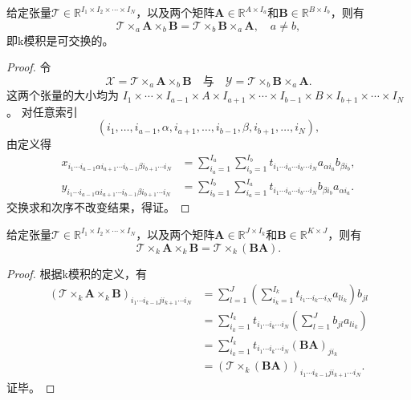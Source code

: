 \begin{property}
    给定张量\( \mathcal{T} \in \mathbb{R}^{I_1 \times I_2 \times \cdots \times I_N} \)，以及两个矩阵\( \mathbf{A} \in \mathbb{R}^{A \times I_a} \)和\( \mathbf{B} \in \mathbb{R}^{B \times I_b} \)，则有
    \[
        \mathcal{T} \times_a \mathbf{A} \times_b \mathbf{B} = \mathcal{T} \times_b \mathbf{B} \times_a \mathbf{A}, \quad a \neq b,
    \]
    即k模积是可交换的。
\end{property}
\begin{proof}
    令
    \[
        \mathcal{X} = \mathcal{T}\times_a \mathbf{A}\times_b \mathbf{B}
        \quad\text{与}\quad
        \mathcal{Y} = \mathcal{T}\times_b \mathbf{B}\times_a \mathbf{A}.
    \]
    这两个张量的大小均为
    $I_1\times\cdots\times I_{a-1}\times A\times I_{a+1}\times\cdots\times
        I_{b-1}\times B\times I_{b+1}\times\cdots\times I_N$。
    对任意索引
    \[
        (i_1,\ldots,i_{a-1},\alpha, i_{a+1},\ldots,i_{b-1},\beta, i_{b+1},\ldots,i_N),
    \]
    由定义得
    \begin{align*}
        x_{i_1\cdots i_{a-1}\alpha i_{a+1}\cdots i_{b-1}\beta i_{b+1}\cdots i_N}
         & = \sum_{i_a=1}^{I_a}\sum_{i_b=1}^{I_b}
        t_{i_1\cdots i_a\cdots i_b\cdots i_N}
        a_{\alpha i_a}b_{\beta i_b},              \\
        y_{i_1\cdots i_{a-1}\alpha i_{a+1}\cdots i_{b-1}\beta i_{b+1}\cdots i_N}
         & = \sum_{i_b=1}^{I_b}\sum_{i_a=1}^{I_a}
        t_{i_1\cdots i_a\cdots i_b\cdots i_N}
        b_{\beta i_b}a_{\alpha i_a}.
    \end{align*}
    交换求和次序不改变结果，得证。
\end{proof}

\begin{property}\label{prop:associative}
    给定张量\( \mathcal{T} \in \mathbb{R}^{I_1 \times I_2 \times \cdots \times I_N} \)，以及两个矩阵\( \mathbf{A} \in \mathbb{R}^{J \times I_k} \)和\( \mathbf{B} \in \mathbb{R}^{K \times J} \)，则有
    \[
        \mathcal{T} \times_k \mathbf{A} \times_k \mathbf{B} = \mathcal{T} \times_k (\mathbf{B} \mathbf{A}).
    \]
\end{property}
\begin{proof}
    根据k模积的定义，有
    \begin{align*}
        \left(\mathcal{T}\times_k \mathbf{A}\times_k \mathbf{B}\right)_{i_1\cdots i_{k-1}j i_{k+1}\cdots i_N}
         & =\sum_{l=1}^{J}\left(\sum_{i_k=1}^{I_k}
        t_{i_1\cdots i_k\cdots i_N} a_{l i_k}\right)b_{jl}                                                    \\
         & =\sum_{i_k=1}^{I_k}t_{i_1\cdots i_k\cdots i_N}
        \left(\sum_{l=1}^{J}b_{jl}a_{l i_k}\right)                                                            \\
         & =\sum_{i_k=1}^{I_k}t_{i_1\cdots i_k\cdots i_N}(\mathbf{B} \mathbf{A})_{j i_k}                      \\
         & = \left(\mathcal{T}\times_k (\mathbf{B}\mathbf{A})\right)_{i_1\cdots i_{k-1} j i_{k+1}\cdots i_N}.
    \end{align*}
    证毕。
\end{proof}


